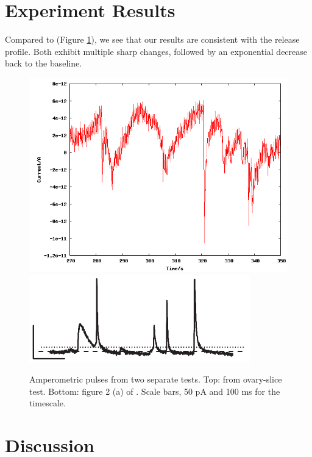 \section{Experiment Results}

Compared to \cite{mosharok2005aee} (Figure \ref{amperometric-pulses}), we see that our results are consistent with the release profile. Both exhibit multiple sharp changes, followed by an exponential decrease back to the baseline.

\begin{figure}
	\centering
	\includegraphics[width=0.5\linewidth]{figures/216.png}
	\includegraphics[width=0.5\linewidth]{figures/mosharok-pulse.png}
	\caption[Amperometric pulses]{Amperometric pulses from two separate tests. Top: from ovary-slice test. Bottom: figure 2 (a) of \cite{mosharok2005aee}. Scale bars, 50 pA and 100 ms for the timescale.}
	\label{amperometric-pulses}
\end{figure}

\section{Discussion}
